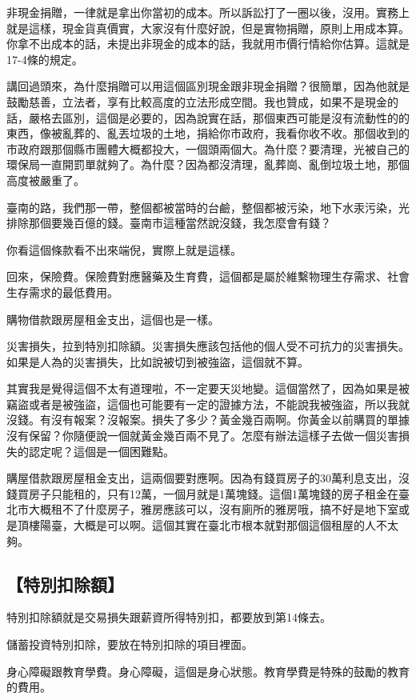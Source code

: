 \documentclass[]{ctexbook}
\begin{document}
非現金捐贈，一律就是拿出你當初的成本。所以訴訟打了一圈以後，沒用。實務上就是這樣，現金貨真價實，大家沒有什麼好說，但是實物捐贈，原則上用成本算。你拿不出成本的話，未提出非現金的成本的話，我就用市價行情給你估算。這就是17-4條的規定。

講回過頭來，為什麼捐贈可以用這個區別現金跟非現金捐贈？很簡單，因為他就是鼓勵慈善，立法者，享有比較高度的立法形成空間。我也贊成，如果不是現金的話，嚴格去區別，這個是必要的，因為說實在話，那個東西可能是沒有流動性的的東西，像被亂葬的、亂丟垃圾的土地，捐給你市政府，我看你收不收。那個收到的市政府跟那個縣市團體大概都投大，一個頭兩個大。為什麼？要清理，光被自己的環保局一直開罰單就夠了。為什麼？因為都沒清理，亂葬崗、亂倒垃圾土地，那個高度被嚴重了。

臺南的路，我們那一帶，整個都被當時的台鹼，整個都被污染，地下水汞污染，光排除那個要幾百億的錢。臺南市這種當然說沒錢，我怎麼會有錢？

你看這個條款看不出來端倪，實際上就是這樣。

回來，保險費。保險費對應醫藥及生育費，這個都是屬於維繫物理生存需求、社會生存需求的最低費用。

購物借款跟房屋租金支出，這個也是一樣。

災害損失，拉到特別扣除額。災害損失應該包括他的個人受不可抗力的災害損失。如果是人為的災害損失，比如說被切到被強盜，這個就不算。

其實我是覺得這個不太有道理啦，不一定要天災地變。這個當然了，因為如果是被竊盜或者是被強盜，這個也可能要有一定的證據方法，不能說我被強盜，所以我就沒錢。有沒有報案？沒報案。損失了多少？黃金幾百兩啊。你黃金以前購買的單據沒有保留？你隨便說一個就黃金幾百兩不見了。怎麼有辦法這樣子去做一個災害損失的認定呢？這個是一個困難點。

購屋借款跟房屋租金支出，這兩個要對應啊。因為有錢買房子的30萬利息支出，沒錢買房子只能租的，只有12萬，一個月就是1萬塊錢。這個1萬塊錢的房子租金在臺北市大概租不了什麼房子，雅房應該可以，沒有廁所的雅房哦，搞不好是地下室或是頂樓陽臺，大概是可以啊。這個其實在臺北市根本就對那個這個租屋的人不太夠。

\hypertarget{ux7279ux5225ux6263ux9664ux984d}{%
\subsection{【特別扣除額】}\label{ux7279ux5225ux6263ux9664ux984d}}

特別扣除額就是交易損失跟薪資所得特別扣，都要放到第14條去。

儲蓄投資特別扣除，要放在特別扣除的項目裡面。

身心障礙跟教育學費。身心障礙，這個是身心狀態。教育學費是特殊的鼓勵的教育的費用。
\end{document}
